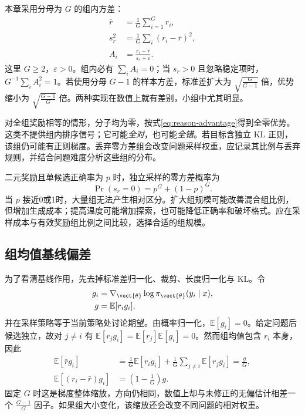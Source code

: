 \documentclass[../textbook.tex]{subfiles}
\begin{document}
本章采用分母为 $G$ 的组内方差：
\begin{equation}\label{eq:reason-advantage}
\begin{aligned}
 \bar r &= \frac1G\sum_{i=1}^G r_i, \\
 s_r^2 &= \frac1G\sum_i(r_i-\bar r)^2, \\
 A_i &= \frac{r_i-\bar r}{s_r+\varepsilon}.
\end{aligned}
\end{equation}
这里 $G\geq2$，$\varepsilon>0$。组内必有 $\sum_i A_i=0$；当 $s_r>0$ 且忽略稳定项时，$G^{-1}\sum_i A_i^2=1$。若使用分母 $G-1$ 的样本方差，标准差扩大为 $\sqrt{\frac{G}{G-1}}$ 倍，优势缩小为 $\sqrt{\frac{G-1}{G}}$ 倍。两种实现在数值上就有差别，小组中尤其明显。

对全组奖励相等的情形，分子均为零，按式\eqref{eq:reason-advantage}得到全零优势。这类不提供组内排序信号；它可能\emph{全对}，也可能\emph{全错}。若目标含独立 KL 正则，该组仍可能有正则梯度。丢弃零方差组会改变问题采样权重，应记录其比例与丢弃规则，并结合问题难度分析这些组的分布。

二元奖励且单候选正确率为 $p$ 时，独立采样的零方差概率为
\begin{equation}
 \Pr(s_r=0)=p^G+(1-p)^G.
\end{equation}
当 $p$ 接近0或1时，大量组无法产生相对区分。扩大组规模可能改善混合组比例，但增加生成成本；提高温度可能增加探索，也可能降低正确率和破坏格式。应在采样成本与有效奖励组比例之间比较，选择合适的组规模。

\subsection{组均值基线偏差}
为了看清基线作用，先去掉标准差归一化、裁剪、长度归一化与 KL。令
\begin{equation}
\begin{aligned}
 g_i &= \nabla_{\vect{\theta}}\log\pi_{\vect{\theta}}(y_i\mid x), \\
 g &= \mathbb E[r_i g_i],
\end{aligned}
\end{equation}
并在采样策略等于当前策略处讨论期望。由概率归一化，$\mathbb E[g_i]=0$。给定问题后候选独立，故对 $j\ne i$ 有 $\mathbb E[r_jg_i]=\mathbb E[r_j]\mathbb E[g_i]=0$。然而组均值包含 $r_i$ 本身，因此
\begin{align}
 \mathbb E[\bar r g_i]
 &=\frac1G\mathbb E[r_i g_i]+\frac1G\sum_{j\ne i}\mathbb E[r_jg_i]=\frac gG,\\
 \mathbb E[(r_i-\bar r)g_i]&=\left(1-\frac1G\right)g.
 \label{eq:reason-selfbaseline}
\end{align}
固定 $G$ 时这是梯度整体缩放，方向仍相同，数值上却与未修正的无偏估计相差一个 $\frac{G-1}{G}$ 因子。如果组大小变化，该缩放还会改变不同问题的相对权重。
\end{document}

